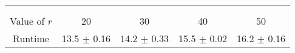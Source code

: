 \begin{table}
    \centering
    \begin{tabular}{ccccc}
        \hline \\
        \vspace*{-0.65cm} \\
        \vspace*{0.05cm}
        Value of $r$ & 20 & 30 & 40 & 50 \\
        \vspace*{0.05cm}
        Runtime & 13.5 $\pm$ 0.16 & 14.2 $\pm$ 0.33 & 15.5 $\pm$ 0.02 & 16.2 $\pm$ 0.16 \\
        \hline
    \end{tabular}
    \label{tbl:logdelta}
\end{table}
